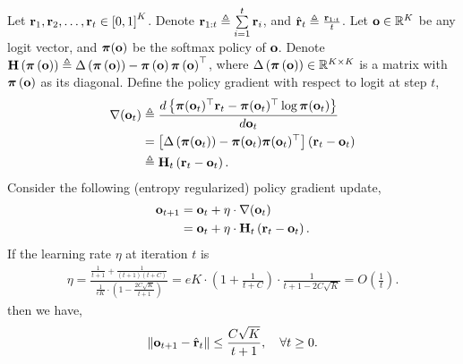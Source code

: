 \documentclass[10pt]{article}
\begin{document}
\begin{lem}
Let ${\mathbf{r}}_1, {\mathbf{r}}_2, \dots, {\mathbf{r}}_t \in \left[ 0, 1  \right]^K$. Denote ${\mathbf{r}}_{1:t} \triangleq \sum\limits_{i=1}^{t}{{\mathbf{r}}_i}$, and $\hat{{\mathbf{r}}}_t \triangleq \frac{{\mathbf{r}}_{1:t}}{t}$. Let ${\mathbf{o}} \in {\mathbb{R}}^K$ be any logit vector, and ${\boldsymbol{\pi}}({\mathbf{o}})$ be the softmax policy of ${\mathbf{o}}$. Denote ${\mathbf{H}}\left( {\boldsymbol{\pi}} \left({\mathbf{o}} \right) \right) \triangleq \Delta \left( {\boldsymbol{\pi}} \left({\mathbf{o}} \right) \right) - {\boldsymbol{\pi}} \left({\mathbf{o}} \right) {\boldsymbol{\pi}} \left({\mathbf{o}} \right)^\top$, where $\Delta \left( {\boldsymbol{\pi}} \left({\mathbf{o}} \right) \right) \in {\mathbb{R}}^{K \times K}$ is a matrix with ${\boldsymbol{\pi}} \left({\mathbf{o}} \right)$ as its diagonal. Define the policy gradient with respect to logit at step $t$,
\begin{equation*}
\begin{split}
    \nabla({\mathbf{o}}_t) &\triangleq \frac{d \left\{ {\boldsymbol{\pi}}({\mathbf{o}}_t)^\top {\mathbf{r}}_t - {\boldsymbol{\pi}}({\mathbf{o}}_t)^\top \log{{\boldsymbol{\pi}}({\mathbf{o}}_t)} \right\} }{d {\mathbf{o}}_t} \\
    &= \left[ \Delta \left( {\boldsymbol{\pi}}({\mathbf{o}}_t) \right) - {\boldsymbol{\pi}}({\mathbf{o}}_t) {\boldsymbol{\pi}}({\mathbf{o}}_t)^\top \right] \left( {\mathbf{r}}_t - {\mathbf{o}}_t \right) \\
    &\triangleq {\mathbf{H}}_t \left( {\mathbf{r}}_t - {\mathbf{o}}_t \right).
\end{split}
\end{equation*}
Consider the following (entropy regularized) policy gradient update,
\begin{equation*}
\begin{split}
    {\mathbf{o}}_{t+1} &= {\mathbf{o}}_t + \eta \cdot \nabla({\mathbf{o}}_t) \\
    &= {\mathbf{o}}_t + \eta \cdot {\mathbf{H}}_t \left( {\mathbf{r}}_t - {\mathbf{o}}_t \right).
\end{split}
\end{equation*}
If the learning rate $\eta$ at iteration $t$ is
\begin{equation*}
\begin{split}
    \eta = \frac{ \frac{1}{t+1} + \frac{1}{(t+1)(t+C)} }{ \frac{1}{e K} \cdot \left( 1 - \frac{2 C \sqrt{K}}{t+1} \right)  } = eK \cdot \left( 1 + \frac{1}{t+C} \right) \cdot \frac{1}{t+1-2C\sqrt{K}} = O\left( \frac{1}{t} \right).
\end{split}
\end{equation*}
then we have,
\begin{equation*}
    \left\| {\mathbf{o}}_{t+1} - \hat{{\mathbf{r}}}_{t} \right\| \le \frac{C \sqrt{K}}{t+1}, \quad \forall t \ge 0.
\end{equation*}
\end{lem}
\end{document}

